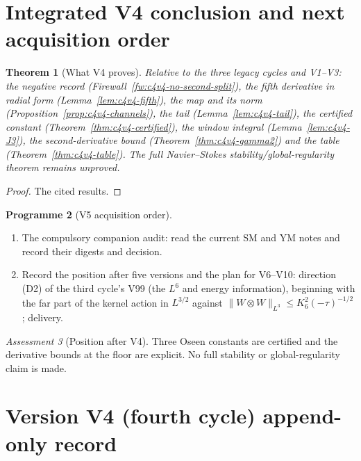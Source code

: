 \documentclass[11pt]{article}
\theoremstyle{plain}
\newtheorem{theorem}{Theorem}[section]
\theoremstyle{definition}
\newtheorem{programme}[theorem]{Programme}
\theoremstyle{remark}
\newtheorem{assessment}[theorem]{Assessment}
\begin{document}
\section{Integrated V4 conclusion and next acquisition order}
\label{sec:c4v4-conclusion}

\begin{theorem}[What V4 proves]
\label{thm:c4v4-conclusion}
Relative to the three legacy cycles and V1--V3: the negative record
(Firewall~\ref{fw:c4v4-no-second-split}), the fifth derivative in radial
form (Lemma~\ref{lem:c4v4-fifth}), the map and its norm
(Proposition~\ref{prop:c4v4-channels}), the tail (Lemma~\ref{lem:c4v4-tail}),
the certified constant (Theorem~\ref{thm:c4v4-certified}), the window
integral (Lemma~\ref{lem:c4v4-J3}), the second-derivative bound
(Theorem~\ref{thm:c4v4-gamma2}) and the table (Theorem~\ref{thm:c4v4-table}).
The full Navier--Stokes stability/global-regularity theorem remains
unproved.
\end{theorem}

\begin{proof}
The cited results.
\end{proof}

\begin{programme}[V5 acquisition order]
\label{prog:c4v5}
\begin{enumerate}[label=\textup{(AC\arabic*)},leftmargin=4.8em]
\item The compulsory companion audit: read the current SM and YM
      notes and record their digests and decision.
\item Record the position after five versions and the plan for
      V6--V10: direction (D2) of the third cycle's V99 (the \(L^6\) and
      energy information), beginning with the far part of the
      kernel action in \(L^{3/2}\) against \(\|W\otimes W\|_{L^3}\le K_6^2(-\tau)^{-1/2}\); delivery.
\end{enumerate}
\end{programme}

\begin{assessment}[Position after V4]
\label{ass:c4v4-position}
Three Oseen constants are certified and the derivative bounds at
the floor are explicit.  No full stability or global-regularity
claim is made.
\end{assessment}

\section*{Version V4 (fourth cycle) append-only record}
\end{document}
